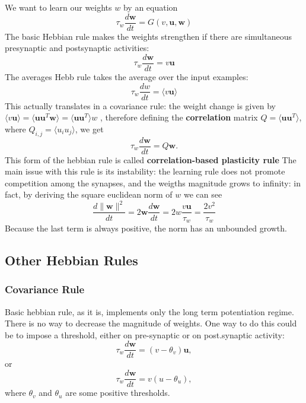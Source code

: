 \documentclass[oneside]{book}
\renewcommand{\u}{\mathbf{u}}
\newcommand{\w}{\mathbf{w}}
\theoremstyle{definition}
\theoremstyle{plain}
\begin{document}
We want to learn our weights $w$ by an equation
\[
    \tau_w \frac{d\w}{dt} =G(v, \u, \w)
\]
The basic Hebbian rule makes the weights strengthen if there are simultaneous presynaptic and postsynaptic activities:
\begin{equation}\label{eqn:hebb}
    \tau_w \frac{d\w}{dt} = v\u
\end{equation}
The averages Hebb rule takes the average over the input examples:
\begin{equation}\label{eqn:avg-hebb}
        \tau_w \frac{dw}{dt} = \langle v\u \rangle
\end{equation}
This actually translates in a covariance rule: the weight change is given by $\langle v\u\rangle = \langle  \u\u^T\w\rangle =\langle \u\u^T\rangle w$ , therefore defining the  \textbf{correlation} matrix $Q=\langle \u \u^T \rangle $, where $Q_{i,j} = \langle u_iu_j\rangle$, we get
\begin{equation}\label{eqn:corr-hebb}
        \tau_w \frac{d\w}{dt} = Q\w.
\end{equation}
This form of the hebbian rule is called \textbf{correlation-based plasticity rule}
The main issue with this rule is its instability: the learning rule does not promote competition among the synapses, and the weigths magnitude grows to infinity:
in fact, by deriving the square euclidean norm of $w$ we can see
\[
    \frac{d\|\w\|^2}{dt} = 2\w \frac{d\w}{dt} = 2w \frac{v\u}{\tau_w} = \frac{2v^2}{\tau_w}
\]
Because the last term is always positive, the norm has an unbounded growth.
\subsection{Other Hebbian Rules}
\subsubsection*{Covariance Rule}
Basic hebbian rule, as it is, implements only the long term potentiation regime. There is no way to decrease the magnitude of weights. One way to do this could be to impose a threshold, either on pre-synaptic or on post.synaptic activity:
\begin{equation}
    \label{eqn:cov-rule1}
    \tau_w \frac{d\w}{dt} = (v-\theta_v)\u,
\end{equation}
or \begin{equation}
    \label{eqn:cov-rule2}
    \tau_w \frac{d\w}{dt} = v(u-\theta_u),
\end{equation}
where $\theta_v$ and $\theta_u$ are some positive thresholds. 
\end{document}
